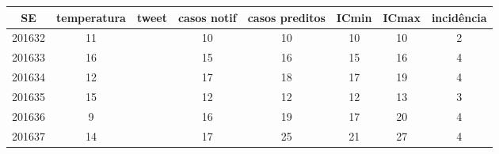 \begin{tabular}{c|ccccccc}
  \hline
SE & temperatura & tweet & casos notif & casos preditos & ICmin & ICmax & incidência \\ 
  \hline
201632 & 11 &  & 10 & 10 & 10 & 10 & 2 \\ 
  201633 & 16 &  & 15 & 16 & 15 & 16 & 4 \\ 
  201634 & 12 &  & 17 & 18 & 17 & 19 & 4 \\ 
  201635 & 15 &  & 12 & 12 & 12 & 13 & 3 \\ 
  201636 & 9 &  & 16 & 19 & 17 & 20 & 4 \\ 
  201637 & 14 &  & 17 & 25 & 21 & 27 & 4 \\ 
   \hline
\end{tabular}
